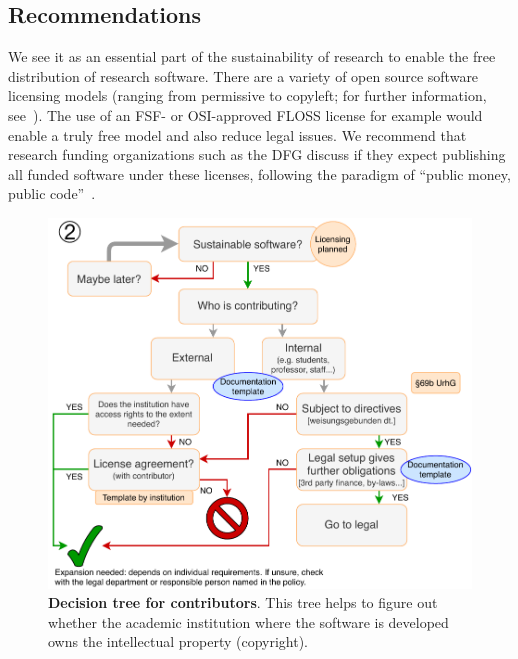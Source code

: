 \documentclass[a4paper,num-refs,numbers,sort&compress]{de-rse}
\begin{document}
\subsection{Recommendations}
We see it as an essential part of the sustainability of research to enable the free distribution of research software. There are a variety of open source software licensing models (ranging from permissive to copyleft; for further information, see~\cite{ifrOSS,tldrlegal,morinQuickGuideSoftware2012}). The use of an FSF- or OSI-approved FLOSS license for example would enable a truly free model and also reduce legal issues. We recommend that research funding organizations such as the DFG discuss if they expect publishing all funded software under these licenses, following the paradigm of ``public money, public code''~\cite{publiccode}.

\begin{figure}[tb]
  \centering
  \includegraphics[width=\linewidth]{tree_sustainable_software}
  \caption{\textbf{Decision tree for contributors}. This tree helps to figure out whether the academic institution where the software is developed owns the intellectual property (copyright).}
  \label{fig:tree1Article}
\end{figure}
\end{document}
